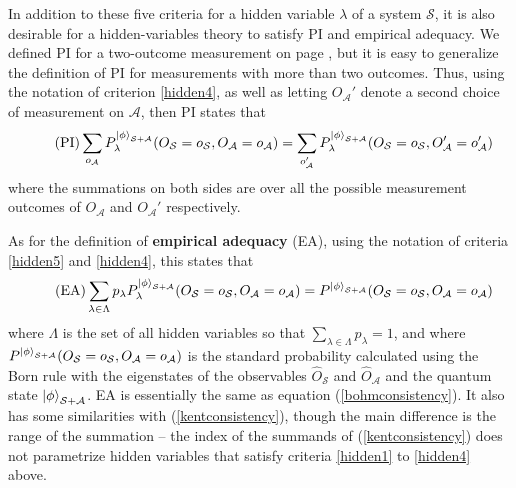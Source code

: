 In addition to these five criteria for a hidden variable $\lambda$ of a system $\mathcal{S}$, it is also desirable for a hidden-variables theory to satisfy PI and empirical adequacy. We defined PI for a two-outcome measurement on page \pageref{PIdef}, but it is easy to generalize the definition of PI for measurements with more than two outcomes. Thus, using the notation of criterion \ref{hidden4}, as well as letting $O_\mathcal{A}'$ denote a second choice of measurement  on $\mathcal{A}$, then PI states that
\begin{equation}\tag{PI}
\sum_{o_\mathcal{A}}P_\lambda^{\ket{\phi}_{\mathcal{S}+\mathcal{A}}}(O_\mathcal{S}=o_\mathcal{S},O_\mathcal{A}=o_\mathcal{A}) = \sum_{o'_\mathcal{A}}P_\lambda^{\ket{\phi}_{\mathcal{S}+\mathcal{A}}}(O_\mathcal{S}=o_\mathcal{S},O'_\mathcal{A}=o'_\mathcal{A}) 
\end{equation}
where the summations on both sides are over all the possible measurement outcomes of $O_\mathcal{A}$ and $O_\mathcal{A}'$ respectively.

As for the definition of \textbf{empirical adequacy} (EA), using the notation of criteria \ref{hidden5} and \ref{hidden4}, this states that
\begin{equation}\tag{EA}\label{adeq}
	\sum_{\lambda\in\Lambda}p_\lambda P_\lambda^{\ket{\phi}_{\mathcal{S}+\mathcal{A}}}(O_\mathcal{S}=o_\mathcal{S},O_\mathcal{A}=o_\mathcal{A})=P^{\ket{\phi}_{\mathcal{S}+\mathcal{A}}}(O_\mathcal{S}=o_\mathcal{S},O_\mathcal{A}=o_\mathcal{A})
\end{equation}
where $\Lambda$ is the set of all hidden variables so that $\sum_{\lambda\in\Lambda} p_\lambda = 1$, and where $P^{\ket{\phi}_{\mathcal{S}+\mathcal{A}}}(O_\mathcal{S}=o_\mathcal{S},O_\mathcal{A}=o_\mathcal{A})$ is the standard probability calculated using the Born rule with the eigenstates of the observables $\hat{O}_\mathcal{S}$ and $\hat{O}_\mathcal{A}$ and the quantum state $\ket{\phi}_{\mathcal{S}+\mathcal{A}}$. EA is essentially the same as equation (\ref{bohmconsistency}). It also has some similarities with (\ref{kentconsistency}), though the main difference is the range of the summation -- the index of the summands of (\ref{kentconsistency}) does not parametrize hidden variables that satisfy criteria \ref{hidden1} to \ref{hidden4} above.

